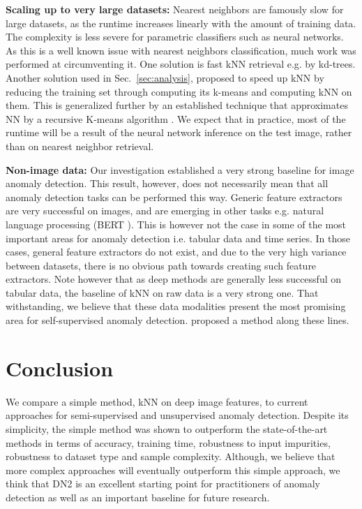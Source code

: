 \documentclass{article}
\begin{document}
\textbf{Scaling up to very large datasets:} Nearest neighbors are famously slow for large datasets, as the runtime increases linearly with the amount of training data. The complexity is less severe for parametric classifiers such as neural networks. As this is a well known issue with nearest neighbors classification, much work was performed at circumventing it. One solution is fast kNN retrieval e.g. by kd-trees. Another solution used in Sec.~\ref{sec:analysis}, proposed to speed up kNN by reducing the training set through computing its k-means and computing kNN on them. This is generalized further by an established technique that approximates NN by a recursive K-means algorithm \cite{fukunaga1975branch}. We expect that in practice, most of the runtime will be a result of the neural network inference on the test image, rather than on nearest neighbor retrieval. 

\textbf{Non-image data:} Our investigation established a very strong baseline for image anomaly detection. This result, however, does not necessarily mean that all anomaly detection tasks can be performed this way. Generic feature extractors are very successful on images, and are emerging in other tasks e.g. natural language processing (BERT \cite{devlin2018bert}). This is however not the case in some of the most important areas for anomaly detection i.e. tabular data and time series. In those cases, general feature extractors do not exist, and due to the very high variance between datasets, there is no obvious path towards creating such feature extractors. Note however that as deep methods are generally less successful on tabular data, the baseline of kNN on raw data is a very strong one. That withstanding, we believe that these data modalities present the most promising area for self-supervised anomaly detection. \citet{bergman2020classification} proposed a method along these lines.

\section{Conclusion}
\label{sec:conc}

We compare a simple method, kNN on deep image features, to current approaches for semi-supervised and unsupervised anomaly detection. Despite its simplicity, the simple method was shown to outperform the state-of-the-art methods in terms of accuracy, training time, robustness to input impurities, robustness to dataset type and sample complexity. Although, we believe that more complex approaches will eventually outperform this simple approach, we think that DN2 is an excellent starting point for practitioners of anomaly detection as well as an important baseline for future research. 



\end{document}
